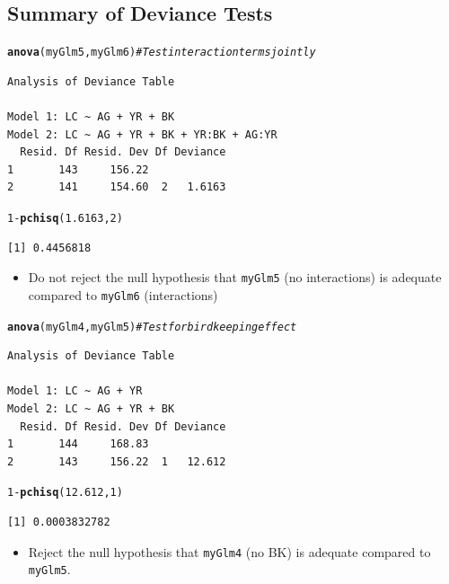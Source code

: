 \documentclass[oneside]{book}\usepackage[]{graphicx}\usepackage[svgnames]{xcolor}
\makeatletter
\newcommand{\hlnum}[1]{\textcolor[rgb]{0.686,0.059,0.569}{#1}}%
\newcommand{\hlcom}[1]{\textcolor[rgb]{0.678,0.584,0.686}{\textit{#1}}}%
\newcommand{\hlopt}[1]{\textcolor[rgb]{0,0,0}{#1}}%
\newcommand{\hlstd}[1]{\textcolor[rgb]{0.345,0.345,0.345}{#1}}%
\newcommand{\hlkwd}[1]{\textcolor[rgb]{0.737,0.353,0.396}{\textbf{#1}}}%
\newenvironment{kframe}{%
 \def\at@end@of@kframe{}%
 \ifinner\ifhmode%
  \def\at@end@of@kframe{\end{minipage}}%
  \begin{minipage}{\columnwidth}%
 \fi\fi%
 \def\FrameCommand##1{\hskip\@totalleftmargin \hskip-\fboxsep
 \colorbox{shadecolor}{##1}\hskip-\fboxsep
     \hskip-\linewidth \hskip-\@totalleftmargin \hskip\columnwidth}%
 \MakeFramed {\advance\hsize-\width
   \@totalleftmargin\z@ \linewidth\hsize
   \@setminipage}}%
 {\par\unskip\endMakeFramed%
 \at@end@of@kframe}
\newenvironment{knitrout}{}{} %
\makeatother
\begin{document}
\subsection*{Summary of Deviance Tests}
\begin{knitrout}
\color{fgcolor}\begin{kframe}
\begin{alltt}
\hlkwd{anova}\hlstd{(myGlm5, myGlm6)}  \hlcom{# Test interaction terms jointly}
\end{alltt}
\begin{verbatim}
Analysis of Deviance Table

Model 1: LC ~ AG + YR + BK
Model 2: LC ~ AG + YR + BK + YR:BK + AG:YR
  Resid. Df Resid. Dev Df Deviance
1       143     156.22            
2       141     154.60  2   1.6163
\end{verbatim}
\begin{alltt}
\hlnum{1} \hlopt{-} \hlkwd{pchisq}\hlstd{(}\hlnum{1.6163}\hlstd{,} \hlnum{2}\hlstd{)}
\end{alltt}
\begin{verbatim}
[1] 0.4456818
\end{verbatim}
\end{kframe}
\end{knitrout}
\begin{itemize}
      \item Do not reject the null hypothesis that \texttt{myGlm5} (no interactions) is adequate
            compared to \texttt{myGlm6} (interactions)
\end{itemize}
\begin{knitrout}
\color{fgcolor}\begin{kframe}
\begin{alltt}
\hlkwd{anova}\hlstd{(myGlm4, myGlm5)}  \hlcom{# Test for bird keeping effect}
\end{alltt}
\begin{verbatim}
Analysis of Deviance Table

Model 1: LC ~ AG + YR
Model 2: LC ~ AG + YR + BK
  Resid. Df Resid. Dev Df Deviance
1       144     168.83            
2       143     156.22  1   12.612
\end{verbatim}
\begin{alltt}
\hlnum{1} \hlopt{-} \hlkwd{pchisq}\hlstd{(}\hlnum{12.612}\hlstd{,} \hlnum{1}\hlstd{)}
\end{alltt}
\begin{verbatim}
[1] 0.0003832782
\end{verbatim}
\end{kframe}
\end{knitrout}
\begin{itemize}
      \item Reject the null hypothesis that \texttt{myGlm4} (no BK) is adequate compared to \texttt{myGlm5}.
\end{itemize}
\end{document}
